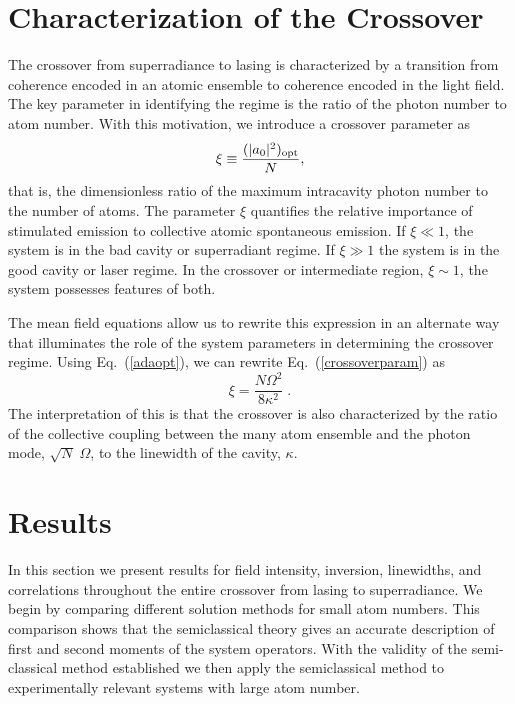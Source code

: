 \documentclass[aps,
twocolumn,
showpacs,
superscriptaddress,groupedaddress]{revtex4}
\begin{document}
\section{Characterization of the Crossover}
\label{sec:CrossoverCharacterization}

The crossover from superradiance to lasing is characterized by a
transition from coherence encoded in an atomic ensemble to coherence
encoded in the light field. The key parameter in identifying the
regime is the ratio of the photon number to atom number. With this
motivation, we introduce a crossover parameter as
\begin{equation}
\xi \equiv \frac{(|a_0|^2)_{\rm opt}}{N},
\label{crossoverparam}
\end{equation}
that is, the dimensionless ratio of the maximum intracavity photon
number to the number of atoms. The parameter $\xi$ quantifies the
relative importance of stimulated emission to collective atomic
spontaneous emission. If $\xi\ll1$, the system is in the bad cavity or
superradiant regime. If $\xi\gg1$ the system is in the good cavity or
laser regime. In the crossover or intermediate region, $\xi\sim1$, the
system possesses features of both.

The mean field equations allow us to rewrite this expression in an
alternate way that illuminates the role of the system parameters in
determining the crossover regime. Using Eq.~(\ref{adaopt}), we can
rewrite Eq.~(\ref{crossoverparam}) as
\begin{equation}
  \xi= \frac{N \Omega^2}{8\kappa^2}\;.
\label{CrossoverParameter2}
\end{equation}
The interpretation of this is that the crossover is also characterized
by the ratio of the collective coupling between the many atom ensemble
and the photon mode, $\sqrt{N}\;\Omega$, to the linewidth of the
cavity, $\kappa$.

\section{Results}
\label{sec:Results}

In this section we present results for field intensity, inversion,
linewidths, and correlations throughout the entire crossover from
lasing to superradiance.  We begin by comparing different solution
methods for small atom numbers.  This comparison shows that the
semiclassical theory gives an accurate description of first and second
moments of the system operators.  With the validity of the
semi-classical method established we then apply the semiclassical
method to experimentally relevant systems with large atom number.
\end{document}
